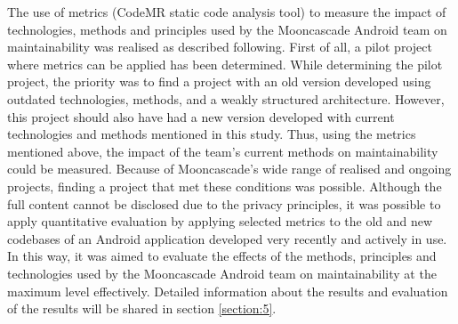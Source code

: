 The use of metrics (CodeMR static code analysis tool) to measure the impact of technologies, methods and principles used by the Mooncascade Android team on maintainability was realised as described following. First of all, a pilot project where metrics can be applied has been determined. While determining the pilot project, the priority was to find a project with an old version developed using outdated technologies, methods, and a weakly structured architecture. However, this project should also have had a new version developed with current technologies and methods mentioned in this study. Thus, using the metrics mentioned above, the impact of the team's current methods on maintainability could be measured. Because of Mooncascade's wide range of realised and ongoing projects, finding a project that met these conditions was possible. Although the full content cannot be disclosed due to the privacy principles, it was possible to apply quantitative evaluation by applying selected metrics to the old and new codebases of an Android application developed very recently and actively in use. In this way, it was aimed to evaluate the effects of the methods, principles and technologies used by the Mooncascade Android team on maintainability at the maximum level effectively. Detailed information about the results and evaluation of the results will be shared in section \ref{section:5}.